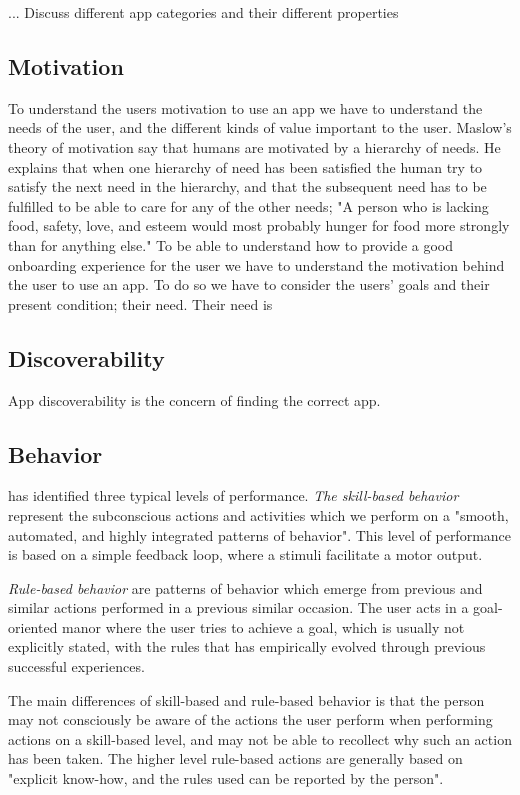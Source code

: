 ... Discuss different app categories and their different properties

\subsection{Motivation}
To understand the users motivation to use an app we have to understand the needs of the user, and the different kinds of value important to the user. Maslow’s theory of motivation \cite{Maslow1943} say that humans are motivated by a hierarchy of needs. He explains that when one hierarchy of need has been satisfied the human try to satisfy the next need in the hierarchy, and that the subsequent need has to be fulfilled to be able to care for any of the other needs; "A person who is lacking food, safety, love, and esteem would most probably hunger for food more strongly than for anything else." To be able to understand how to provide a good onboarding experience for the user we have to understand the motivation behind the user to use an app. To do so we have to consider the users’ goals and their present condition; their need. Their need is

\subsection{Discoverability}
App discoverability is the concern of finding the correct app. 

\subsection{Behavior}
\cite{Rasmussen1983} has identified three typical levels of performance. \textit{The skill-based behavior} represent the subconscious actions and activities which we perform on a "smooth, automated, and highly integrated patterns of behavior". This level of performance is based on a simple feedback loop, where a stimuli facilitate a motor output. 

\textit{Rule-based behavior} are patterns of behavior which emerge from previous and similar actions performed in a previous similar occasion. The user acts in a goal-oriented manor where the user tries to achieve a goal, which is usually not explicitly stated, with the rules that has empirically evolved through previous successful experiences. 

The main differences of skill-based and rule-based behavior is that the person may not consciously be aware of the actions the user perform when performing actions on a skill-based level, and may not be able to recollect why such an action has been taken. The higher level rule-based actions are generally based on "explicit know-how, and the rules used can be reported by the person".

